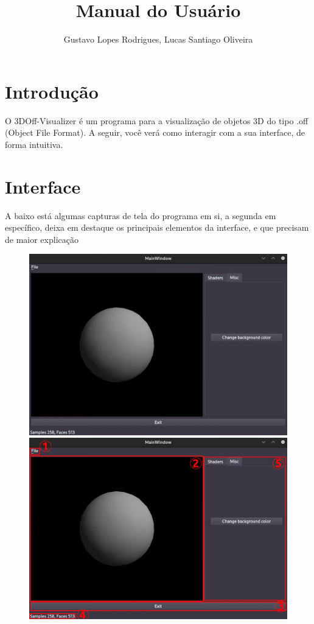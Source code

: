 \documentclass{ol-softwaremanual}
\title{Manual do Usuário}
\author{Gustavo Lopes Rodrigues, Lucas Santiago Oliveira}
\begin{document}
\maketitle

\tableofcontents
\newpage

\section{Introdução}

O 3DOff-Visualizer é um programa para a visualização de 
objetos 3D do tipo .off (Object File Format). A seguir, você verá
como interagir com a sua interface, de forma intuitiva.

\section{Interface}

A baixo está algumas capturas de tela do programa em si, a segunda 
em específico, deixa em destaque os principais elementos 
da interface, e que precisam de maior explicação

\begin{figure}[ht]
    \centering
    \includegraphics[width=.7\textwidth]{Interface.jpg}
    \includegraphics[width=.7\textwidth]{Interfacemarcada.jpg}
\end{figure}
\end{document}
